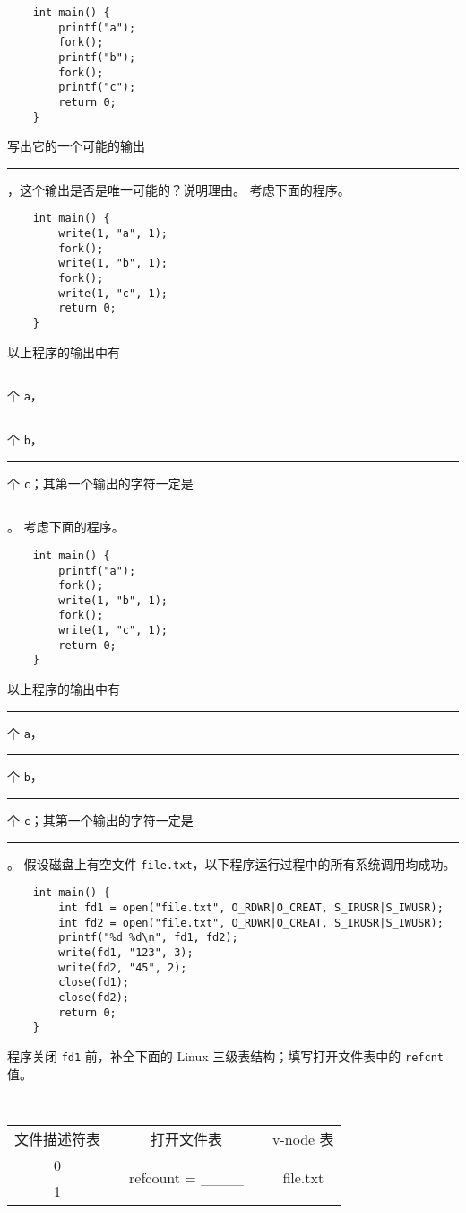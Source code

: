 \begin{problems}
\begin{verbatim}
    int main() {
        printf("a");
        fork();
        printf("b");
        fork();
        printf("c");
        return 0;
    }
        \end{verbatim}
        写出它的一个可能的输出 \rule{3.5cm}{0.25mm}，这个输出是否是唯一可能的？说明理由。
        \qn 考虑下面的程序。
        \begin{verbatim}
    int main() {
        write(1, "a", 1);
        fork();
        write(1, "b", 1);
        fork();
        write(1, "c", 1);
        return 0;
    }
        \end{verbatim}
        以上程序的输出中有 \rule{1cm}{0.25mm} 个 \verb|a|，\rule{1cm}{0.25mm} 个 \verb|b|，\rule{1cm}{0.25mm} 个 \verb|c|；其第一个输出的字符一定是 \rule{1cm}{0.25mm}。
        \qn 考虑下面的程序。
        \begin{verbatim}
    int main() {
        printf("a");
        fork();
        write(1, "b", 1);
        fork();
        write(1, "c", 1);
        return 0;
    }
        \end{verbatim}
        以上程序的输出中有 \rule{1cm}{0.25mm} 个 \verb|a|，\rule{1cm}{0.25mm} 个 \verb|b|，\rule{1cm}{0.25mm} 个 \verb|c|；其第一个输出的字符一定是 \rule{1cm}{0.25mm}。
        \pro 假设磁盘上有空文件 \verb|file.txt|，以下程序运行过程中的所有系统调用均成功。
        \begin{verbatim}
    int main() {
        int fd1 = open("file.txt", O_RDWR|O_CREAT, S_IRUSR|S_IWUSR); 
        int fd2 = open("file.txt", O_RDWR|O_CREAT, S_IRUSR|S_IWUSR); 
        printf("%d %d\n", fd1, fd2);
        write(fd1, "123", 3);
        write(fd2, "45", 2);
        close(fd1);
        close(fd2);
        return 0;
    }
        \end{verbatim}
        \qn 程序关闭 \verb|fd1| 前，补全下面的 Linux 三级表结构；填写打开文件表中的 \verb|refcnt| 值。
        \begin{table}[H]
            \tt
            \centering
            \begin{tabular}{ccccc}
                文件描述符表 & {\qquad \qquad \qquad} & 打开文件表 & {\qquad \qquad \qquad} & v-node 表 \\ \cline{1-1} \cline{3-3} \cline{5-5} 
                \multicolumn{1}{|c|}{0} & \multicolumn{1}{c|}{} & \multicolumn{1}{c|}{\multirow{2}{*}{refcount = \_\_\_\_}} & \multicolumn{1}{c|}{} & \multicolumn{1}{c|}{\multirow{6}{*}{file.txt}} \\ \cline{1-1}
                \multicolumn{1}{|c|}{1} & \multicolumn{1}{c|}{} & \multicolumn{1}{c|}{} & \multicolumn{1}{c|}{} & \multicolumn{1}{c|}{} \\ \cline{1-1} \cline{3-3}

\end{tabular}
\end{table}
\end{problems}
